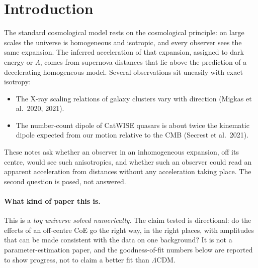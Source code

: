 \documentclass[11pt]{article}
\begin{document}
\section{Introduction}\label{sec:intro}
The standard cosmological model rests on the cosmological principle: on large scales the universe is homogeneous and isotropic, and every observer sees the same expansion. The inferred acceleration of that expansion, assigned to dark energy or $\Lambda$, comes from supernova distances that lie above the prediction of a decelerating homogeneous model.
Several observations sit uneasily with exact isotropy:
\begin{itemize}
\item The X-ray scaling relations of galaxy clusters vary with direction (Migkas et al.\ 2020, 2021).
\item The number-count dipole of CatWISE quasars is about twice the kinematic dipole expected from our motion relative to the CMB (Secrest et al.\ 2021).
\end{itemize}
These notes ask whether an observer in an inhomogeneous expansion, off its centre, would see such anisotropies, and whether such an observer could read an apparent acceleration from distances without any acceleration taking place. The second question is posed, not answered.

\paragraph{What kind of paper this is.} This is a \emph{toy universe solved numerically}. The claim tested is directional: do the effects of an off-centre CoE go the right way, in the right places, with amplitudes that can be made consistent with the data on one background? It is not a parameter-estimation paper, and the goodness-of-fit numbers below are reported to show progress, not to claim a better fit than $\Lambda$CDM.
\end{document}
